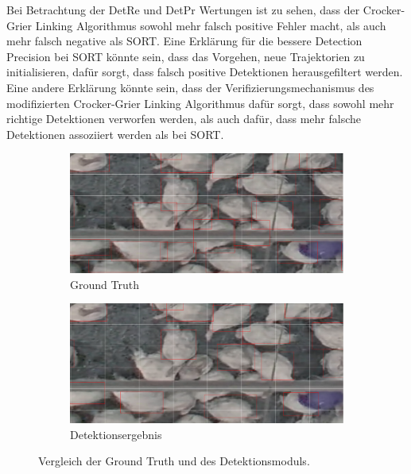 Bei Betrachtung der DetRe und DetPr Wertungen ist zu sehen, dass der Crocker-Grier Linking Algorithmus sowohl mehr falsch positive Fehler macht, als auch mehr falsch negative als SORT. Eine Erklärung für die bessere Detection Precision bei SORT könnte sein, dass das Vorgehen, neue Trajektorien zu initialisieren, dafür sorgt, dass falsch positive Detektionen herausgefiltert werden. Eine andere Erklärung könnte sein, dass der Verifizierungsmechanismus des modifizierten Crocker-Grier Linking Algorithmus dafür sorgt, dass sowohl mehr richtige Detektionen verworfen werden, als auch dafür, dass mehr falsche Detektionen assoziiert werden als bei SORT. \par

\begin{figure}
    \begin{center}
        \vspace*{-10mm}
        \begin{subfigure}[b]{0.5\textwidth}
             \centering
             \includegraphics[width=\textwidth]{img/Vergleich GT_Track GT.png}
             \caption{Ground Truth}
         \end{subfigure}
         \hfill
         \begin{subfigure}[b]{0.5\textwidth}
             \centering         
             \includegraphics[width=\textwidth]{img/Vergleich GT_Track Tracking.png}
             \caption{Detektionsergebnis}
         \end{subfigure}
        \vspace*{-11mm}
        \caption{Vergleich der Ground Truth und des Detektionsmoduls.}
        \label{fig:GTvsDetsComp}
    \end{center}
\end{figure}
